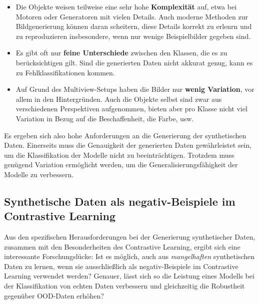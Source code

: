 \begin{itemize}
	\item Die Objekte weisen teilweise eine sehr hohe \textbf{Komplexität} auf, etwa bei Motoren oder Generatoren mit vielen Details. Auch moderne Methoden zur Bildgenerierung können daran scheitern, diese Details korrekt zu erlenrn und zu reproduzieren \textemdash insbesondere, wenn nur wenige Beispielbilder gegeben sind.
	\item Es gibt oft nur \textbf{feine Unterschiede} zwischen den Klassen, die es zu berücksichtigen gilt. Sind die generierten Daten nicht akkurat genug, kann es zu Fehlklassifikationen kommen.
	\item Auf Grund des Multiview-Setups haben die Bilder nur \textbf{wenig Variation}, vor allem in den Hintergründen. Auch die Objekte selbst sind zwar aus verschiedenen Perspektiven aufgenommen, bieten aber pro Klasse nicht viel Variation in Bezug auf die Beschaffenheit, die Farbe, usw.
\end{itemize}

Es ergeben sich also hohe Anforderungen an die Generierung der synthetischen Daten. Einerseits muss die Genauigkeit der generierten Daten gewährleistet sein, um die Klassifikation der Modelle nicht zu beeinträchtigen. Trotzdem muss genügend Variation ermöglicht werden, um die Generalisierungsfähigkeit der Modelle zu verbessern.

\subsection{Synthetische Daten als negativ-Beispiele im Contrastive Learning} \label{sec:synt-ood-contrastive}

Aus den spezifischen Herausforderungen bei der Generierung synthetischer Daten, zusammen mit den Besonderheiten des Contrastive Learning, ergibt sich eine interessante Forschungslücke: Ist es möglich, auch aus \textit{mangelhaften} synthetischen Daten zu lernen, wenn sie ausschließlich als negativ-Beispiele im Contrastive Learning verwendet werden? Genauer, lässt sich so die Leistung eines Modells bei der Klassifikation von echten Daten verbessern und gleichzeitig die Robustheit gegenüber OOD-Daten erhöhen?

